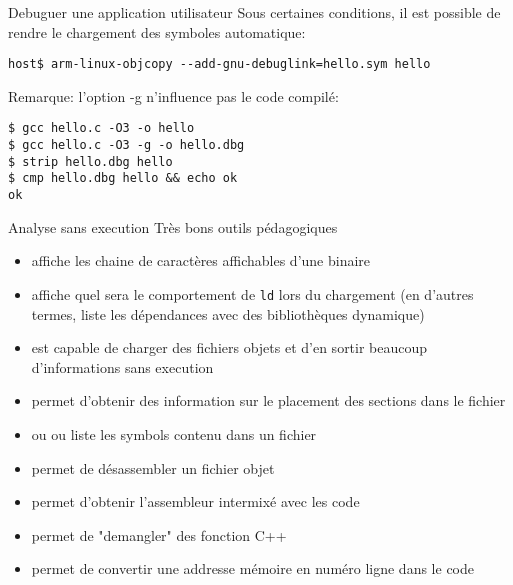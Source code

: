 \begin{frame}[fragile=singleslide]{Debuguer une application utilisateur}
  Sous certaines conditions, il est possible de rendre le chargement
  des symboles automatique:
  \begin{lstlisting}
host$ arm-linux-objcopy --add-gnu-debuglink=hello.sym hello
  \end{lstlisting}  
  Remarque: l'option -g n'influence pas le code compilé:
    \begin{lstlisting}
$ gcc hello.c -O3 -o hello
$ gcc hello.c -O3 -g -o hello.dbg
$ strip hello.dbg hello
$ cmp hello.dbg hello && echo ok
ok
    \end{lstlisting}  %
\end{frame}

\begin{frame}[fragile=singleslide]{Analyse sans execution}
  Très bons outils pédagogiques
  \begin{itemize}
  \item  {} affiche  les chaine  de  caractères affichables
    d'une binaire
  \item {} affiche quel  sera le comportement de \verb+ld+ lors
    du chargement (en d'autres  termes, liste les dépendances avec des
    bibliothèques dynamique)
  \item {} est  capable de charger des fichiers  objets et d'en
    sortir beaucoup d'informations sans execution
  \item  {} permet  d'obtenir  des  information sur  le
    placement des sections dans le fichier
  \item  {} ou    ou   liste les
    symbols contenu dans un fichier
  \item {} permet de désassembler un fichier objet
  \item {}  permet d'obtenir l'assembleur intermixé avec
    les code
  \item {} permet de "demangler" des fonction C++
  \item {}  permet de convertir une  addresse mémoire en
    numéro ligne dans le code
  \end{itemize}
\end{frame}

